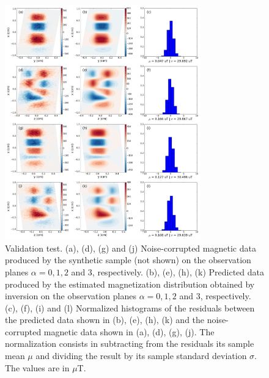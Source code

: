 \documentclass[draft,gc]{agutex}
\begin{document}
 \begin{figure}
 \noindent \includegraphics[width=20pc]{Figs/Fig5_LQ.png}
 \caption{Validation test. (a), (d), (g) and (j) Noise-corrupted
 magnetic data produced by the synthetic sample (not shown) on the
 observation planes $\alpha = 0, 1, 2$ and $3$, respectively.
 (b), (e), (h), (k) Predicted data produced by the estimated
 magnetization distribution obtained by inversion on the
 observation planes $\alpha = 0, 1, 2$ and $3$, respectively.
 (c), (f), (i) and (l) Normalized histograms of the residuals between the
 predicted data shown in (b), (e), (h), (k) and the 
 noise-corrupted magnetic data shown in (a), (d), (g), (j). 
 The normalization
 consists in subtracting from the residuals its sample mean $\mu$ 
 and dividing the result by its sample standard deviation $\sigma$.
 The values are in $\mu$T.}
 \label{fig:datafit-validation}
 \end{figure}
 
\end{document}
